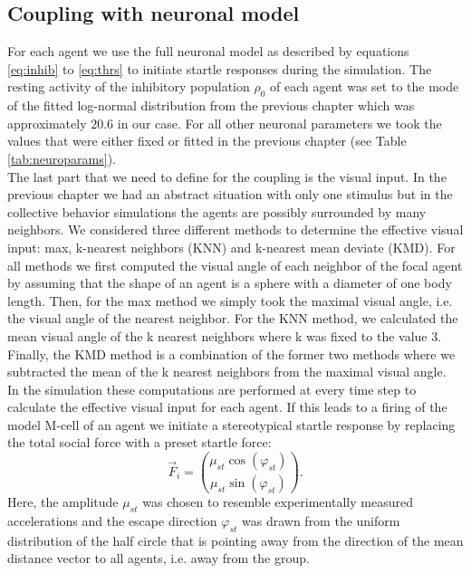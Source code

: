 	\subsection{Coupling with neuronal model}
	For each agent we use the full neuronal model as described by equations \ref{eq:inhib} to \ref{eq:thrs} to initiate startle responses during the simulation.
    The resting activity of the inhibitory population $\rho_{0}$ of each agent was set to the mode of the fitted log-normal distribution from the previous chapter which was approximately $20.6$ in our case.
    For all other neuronal parameters we took the values that were either fixed or fitted in the previous chapter (see Table \ref{tab:neuroparams}).\\
    The last part that we need to define for the coupling is the visual input.
    In the previous chapter we had an abstract situation with only one stimulus but in the collective behavior simulations the agents are possibly surrounded by many neighbors.
    We considered three different methods to determine the effective visual input: max, k-nearest neighbors (KNN) and k-nearest mean deviate (KMD).
    For all methods we first computed the visual angle of each neighbor of the focal agent by assuming that the shape of an agent is a sphere with a diameter of one body length.
    Then, for the max method we simply took the maximal visual angle, i.e. the visual angle of the nearest neighbor.
    For the KNN method, we calculated the mean visual angle of the k nearest neighbors where k was fixed to the value 3.
    Finally, the KMD method is a combination of the former two methods where we subtracted the mean of the k nearest neighbors from the maximal visual angle.\\
    In the simulation these computations are performed at every time step to calculate the effective visual input for each agent.
    If this leads to a firing of the model M-cell of an agent we initiate a stereotypical startle response by replacing the total social force with a preset startle force:
	\begin{equation}
		\vec{F}_i =  {\mu_{st} \cos(\varphi_{st}) \choose \mu_{st} \sin(\varphi_{st})}.
		\label{eq:startle_force}
	\end{equation}
    Here, the amplitude $\mu_{st}$ was chosen to resemble experimentally measured accelerations and the escape direction $\varphi_{st}$ was drawn from the uniform distribution of the half circle that is pointing away from the direction of the mean distance vector to all agents, i.e. away from the group.
